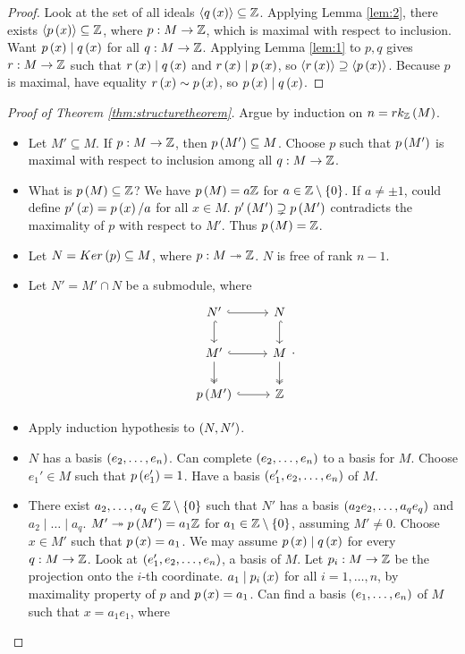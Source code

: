 \begin{proof}
Look at the set of all ideals $ \left\langle q\left( x \right) \right\rangle \subseteq \mathbb{Z} $. Applying Lemma \ref{lem:2}, there exists $ \left\langle p\left( x \right) \right\rangle \subseteq \mathbb{Z} $, where $ p : M \to \mathbb{Z} $, which is maximal with respect to inclusion. Want $ p\left( x \right) \mid q\left( x \right) $ for all $ q : M \to \mathbb{Z} $. Applying Lemma \ref{lem:1} to $ p, q $ gives $ r : M \to \mathbb{Z} $ such that $ r\left( x \right) \mid q\left( x \right) $ and $ r\left( x \right) \mid p\left( x \right) $, so $ \left\langle r\left( x \right) \right\rangle \supseteq \left\langle p\left( x \right) \right\rangle $. Because $ p $ is maximal, have equality $ r\left( x \right) \sim p\left( x \right) $, so $ p\left( x \right) \mid q\left( x \right) $.
\end{proof}

\begin{proof}[Proof of Theorem \ref{thm:structuretheorem}]
Argue by induction on $ n = rk_{\mathbb{Z}}\left( M \right) $.
\begin{itemize}
\item Let $ M' \subseteq M $. If $ p : M \to \mathbb{Z} $, then $ p\left( M' \right) \subseteq M $. Choose $ p $ such that $ p\left( M' \right) $ is maximal with respect to inclusion among all $ q : M \to \mathbb{Z} $.
\item What is $ p\left( M \right) \subseteq \mathbb{Z} $? We have $ p\left( M \right) = a\mathbb{Z} $ for $ a \in \mathbb{Z} \setminus \left\{ 0 \right\} $. If $ a \ne \pm 1 $, could define $ p'\left( x \right) = p\left( x \right) / a $ for all $ x \in M $. $ p'\left( M' \right) \supsetneq p\left( M' \right) $ contradicts the maximality of $ p $ with respect to $ M' $. Thus $ p\left( M \right) = \mathbb{Z} $.
\item Let $ N = Ker\left( p \right) \subseteq M $, where $ p : M \twoheadrightarrow \mathbb{Z} $. $ N $ is free of rank $ n - 1 $.
\item Let $ N' = M' \cap N $ be a submodule, where
$$
\begin{tikzcd}
N' \arrow[hookrightarrow]{r} \arrow[hookrightarrow]{d} & N \arrow[hookrightarrow]{d} \\
M' \arrow[hookrightarrow]{r} \arrow[twoheadrightarrow]{d} & M \arrow[twoheadrightarrow]{d} \\
p\rb{M'} \arrow[hookrightarrow]{r} & \Z
\end{tikzcd}.
$$
\item Apply induction hypothesis to $ \left( N, N' \right) $.
\item $ N $ has a basis $ \left( e_2, \dots, e_n \right) $. Can complete $ \left( e_2, \dots, e_n \right) $ to a basis for $ M $. Choose $ e_1' \in M $ such that $ p\left( e_1' \right) = 1 $. Have a basis $ \left( e_1', e_2, \dots, e_n \right) $ of $ M $.
\item There exist $ a_2, \dots, a_q \in \mathbb{Z} \setminus \left\{ 0 \right\} $ such that $ N' $ has a basis $ \left( a_2e_2, \dots, a_qe_q \right) $ and $ a_2 \mid \dots \mid a_q $. $ M' \twoheadrightarrow p\left( M' \right) = a_1\mathbb{Z} $ for $ a_1 \in \mathbb{Z} \setminus \left\{ 0 \right\} $, assuming $ M' \ne 0 $. Choose $ x \in M' $ such that $ p\left( x \right) = a_1 $. We may assume $ p\left( x \right) \mid q\left( x \right) $ for every $ q : M \to \mathbb{Z} $. Look at $ \left( e_1', e_2, \dots, e_n \right) $, a basis of $ M $. Let $ p_i : M \to \mathbb{Z} $ be the projection onto the $ i $-th coordinate. $ a_1 \mid p_i\left( x \right) $ for all $ i = 1, \dots, n $, by maximality property of $ p $ and $ p\left( x \right) = a_1 $. Can find a basis $ \left( e_1, \dots, e_n \right) $ of $ M $ such that $ x = a_1e_1 $, where

\end{itemize}
\end{proof}
